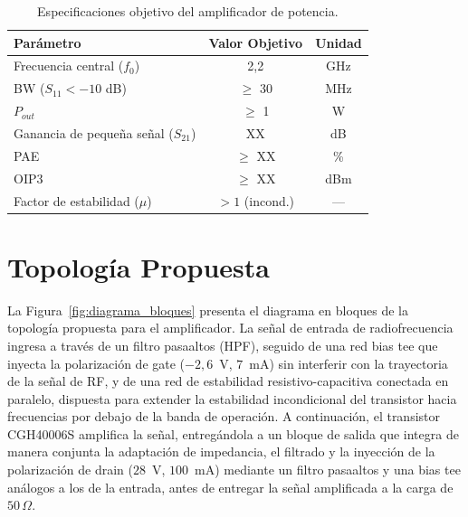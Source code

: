 \begin{table}[H]
    \centering
    \caption{Especificaciones objetivo del amplificador de potencia.}
    \label{tab:objetivos_diseno}
    \begin{tabular}{lcc}
        \hline\hline
        \textbf{Parámetro}                   & \textbf{Valor Objetivo} & \textbf{Unidad} \\
        \hline
        Frecuencia central ($f_0$)           & 2,2                     & GHz             \\
        BW ($S_{11} < -10$ dB)               & $\ge$ 30                & MHz             \\
        $P_{out}$                            & $\ge$ 1                 & W               \\
        Ganancia de pequeña señal ($S_{21}$) & XX                      & dB              \\
        PAE                                  & $\ge$ XX                & \%              \\
        OIP3                                 & $\ge$ XX                & dBm             \\
        Factor de estabilidad ($\mu$)        & $> 1$ (incond.)         & ---             \\
        \hline\hline
    \end{tabular}
\end{table}

\section{Topología Propuesta}
La Figura~\ref{fig:diagrama_bloques} presenta el diagrama en bloques de la topología propuesta para el amplificador. La señal de entrada de radiofrecuencia ingresa a través de un filtro pasaaltos (HPF), seguido de una red bias tee que inyecta la polarización de gate ($-2{,}6$~V, $7$~mA) sin interferir con la trayectoria de la señal de RF, y de una red de estabilidad resistivo-capacitiva conectada en paralelo, dispuesta para extender la estabilidad incondicional del transistor hacia frecuencias por debajo de la banda de operación. A continuación, el transistor CGH40006S amplifica la señal, entregándola a un bloque de salida que integra de manera conjunta la adaptación de impedancia, el filtrado y la inyección de la polarización de drain ($28$~V, $100$~mA) mediante un filtro pasaaltos y una bias tee análogos a los de la entrada, antes de entregar la señal amplificada a la carga de $50\,\Omega$.

